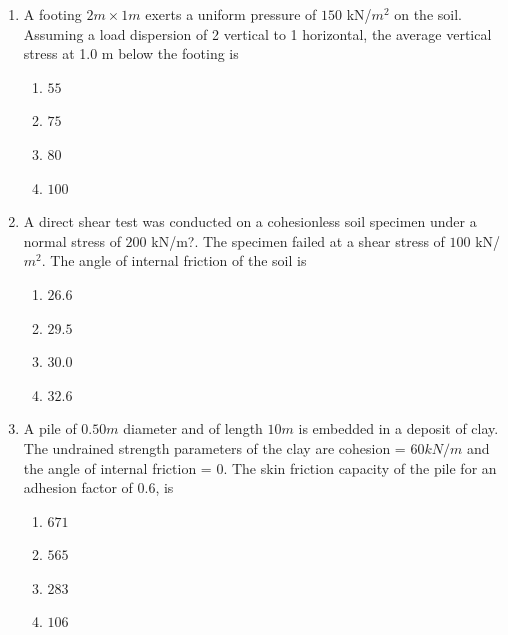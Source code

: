 \documentclass[journal]{IEEEtran}
\begin{document}
\begin{enumerate}
\item A footing $2 m \times 1 m$ exerts a uniform pressure of $150$ kN/$m^{2}$ on the soil. Assuming a load
dispersion of 2 vertical to 1 horizontal, the average vertical stress  at 1.0 m below the
footing is \textbf{}

\begin{multicols}{2}

\begin{enumerate}
\item $55$
\item $75$
\item $80$
\item $100$
\end{enumerate}     
\end{multicols}

\item A direct shear test was conducted on a cohesionless soil  specimen under a normal stress of $200$ kN/m?. The specimen failed at a shear stress of $100$ kN/$m^{2}$. The angle of internal friction of the soil  is \textbf{}

\begin{multicols}{2}

\begin{enumerate}
\item $26.6$
\item $29.5$
\item $30.0$
\item $32.6$
\end{enumerate}     
\end{multicols}

\item A pile of $0.50 m$ diameter and of length $10 m$ is embedded in a deposit of clay. The undrained strength parameters of the clay are cohesion = $60 kN/m$ and the angle of internal friction = $0$. The skin friction capacity  of the pile for an adhesion factor of $0.6$, is \textbf{}

\begin{multicols}{2}

\begin{enumerate}
\item $671$
\item $565$
\item $283$
\item $106$
\end{enumerate}     
\end{multicols}


\end{enumerate}
\end{document}
